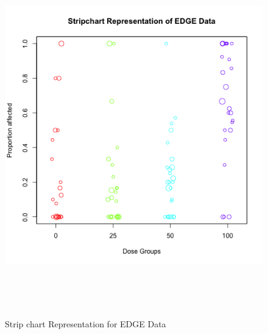 \documentclass[12pt,oneside]{report}
\theoremstyle{definition}
\theoremstyle{mystyle}
\begin{document}
\newpage
\begin{figure}[h]
	\begin{center}
		\includegraphics*[height=14cm,width=14cm]{stripedge.png}\
	\end{center}
	\vspace{-0.3in}
	\caption{ Strip chart Representation for EDGE Data}
	\label{Fig:p2}
\end{figure}	
\end{document}
